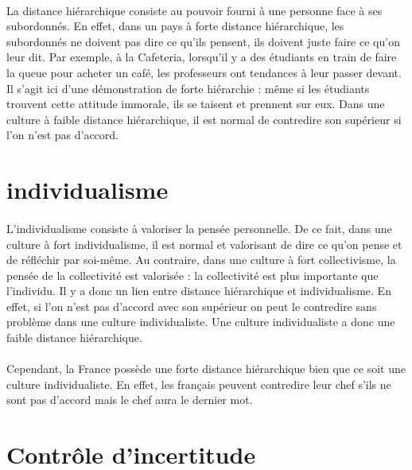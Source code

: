 \paragraph{} La distance hiérarchique consiste au pouvoir fourni à une personne
face à ses subordonnés. En effet, dans un pays à forte distance hiérarchique,
les subordonnés ne doivent pas dire ce qu’ils pensent, ils doivent juste faire
ce qu’on leur dit. Par exemple, à la Cafeteria, lorsqu’il y a des étudiants en
train de faire la queue pour acheter un café, les professeurs ont tendances à
leur passer devant. Il s’agit ici d’une démonstration de forte hiérarchie :
même si les étudiants trouvent cette attitude immorale, ils se taisent et
prennent sur eux. Dans une culture à faible distance hiérarchique, il est
normal de contredire son supérieur si l’on n’est pas d’accord.

\section{individualisme}

\paragraph{} L’individualisme consiste à valoriser la pensée personnelle. De ce
fait, dans une culture à fort individualisme, il est normal et valorisant de
dire ce qu’on pense et de réfléchir par soi-même. Au contraire, dans une
culture à fort collectivisme, la pensée de la collectivité est valorisée : la
collectivité est plus importante que l’individu. Il y a donc un lien entre
distance hiérarchique et individualisme. En effet, si l’on n’est pas d’accord
avec son supérieur on peut le contredire sans problème dans une culture
individualiste. Une culture individualiste a donc une faible distance
hiérarchique.

\paragraph{} Cependant, la France possède une forte distance hiérarchique bien
que ce soit une culture individualiste. En effet, les français peuvent
contredire leur chef s’ils ne sont pas d’accord mais le chef aura le dernier
mot.

\section{Contrôle d'incertitude}

